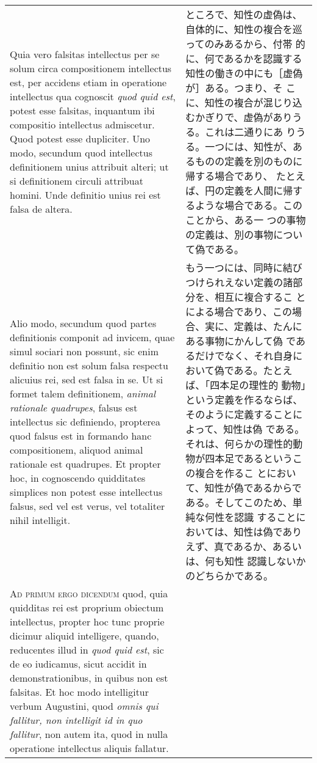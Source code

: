 \documentclass[paper=a4paper,fontsize=10pt,jafontsize=9pt,titlepage]{jlreq}
\begin{document}
\begin{longtable}{p{21em}p{21em}}
\\

Quia vero falsitas intellectus per se solum circa compositionem
intellectus est, per accidens etiam in operatione intellectus qua
cognoscit {\itshape quod quid est}, potest esse falsitas, inquantum
ibi compositio intellectus admiscetur. Quod potest esse
dupliciter. Uno modo, secundum quod intellectus definitionem unius
attribuit alteri; ut si definitionem circuli attribuat homini. Unde
definitio unius rei est falsa de altera.


&

ところで、知性の虚偽は、自体的に、知性の複合を巡ってのみあるから、付帯
的に、何であるかを認識する知性の働きの中にも［虚偽が］ある。つまり、そ
こに、知性の複合が混じり込むかぎりで、虚偽がありうる。これは二通りにあ
りうる。一つには、知性が、あるものの定義を別のものに帰する場合であり、
たとえば、円の定義を人間に帰するような場合である。このことから、ある一
つの事物の定義は、別の事物について偽である。

\\



Alio modo, secundum quod partes definitionis componit ad invicem, quae
simul sociari non possunt, sic enim definitio non est solum falsa
respectu alicuius rei, sed est falsa in se. Ut si formet talem
definitionem, {\itshape animal rationale quadrupes}, falsus est
intellectus sic definiendo, propterea quod falsus est in formando hanc
compositionem, aliquod animal rationale est quadrupes. Et propter hoc,
in cognoscendo quidditates simplices non potest esse intellectus
falsus, sed vel est verus, vel totaliter nihil intelligit.


&

もう一つには、同時に結びつけられえない定義の諸部分を、相互に複合するこ
とによる場合であり、この場合、実に、定義は、たんにある事物にかんして偽
であるだけでなく、それ自身において偽である。たとえば、「四本足の理性的
動物」という定義を作るならば、そのように定義することによって、知性は偽
である。それは、何らかの理性的動物が四本足であるというこの複合を作るこ
とにおいて、知性が偽であるからである。そしてこのため、単純な何性を認識
することにおいては、知性は偽でありえず、真であるか、あるいは、何も知性
認識しないかのどちらかである。


\\


{\scshape Ad primum ergo dicendum} quod, quia quidditas rei est
proprium obiectum intellectus, propter hoc tunc proprie dicimur
aliquid intelligere, quando, reducentes illud in {\itshape quod quid
est}, sic de eo iudicamus, sicut accidit in demonstrationibus, in
quibus non est falsitas. Et hoc modo intelligitur verbum Augustini,
quod {\itshape omnis qui fallitur, non intelligit id in quo fallitur},
non autem ita, quod in nulla operatione intellectus aliquis fallatur.


\end{longtable}
\end{document}
